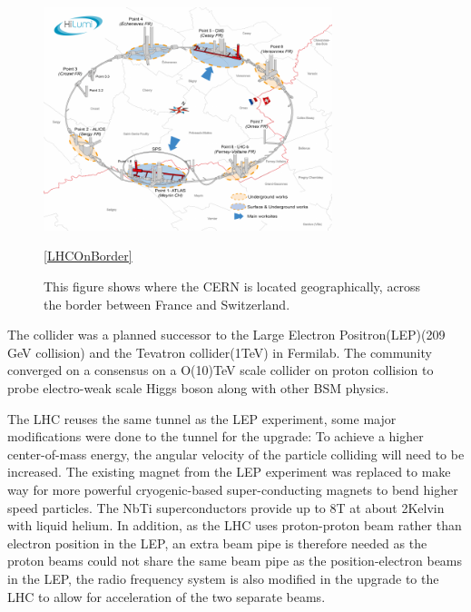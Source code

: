 \begin{figure}[!htb]
    \begin{center}
        \includegraphics[width=0.75\textwidth]{figures/chapter_ATLAS/LHCOnBorder}
        \caption{
			This figure shows where the CERN is located geographically, across the border between France and Switzerland. \cite{Brüning:782076} 
        }
        \label{fig:CERNAcceleratorComplex}
        \ref{LHCOnBorder}
    \end{center}
\end{figure}

The collider was a planned successor to the Large Electron Positron(LEP)(209 GeV collision) and the Tevatron collider(1TeV) in Fermilab. The community converged on a consensus on a O(10)TeV scale collider on proton collision to probe electro-weak scale Higgs boson along with other BSM physics.

The LHC reuses the same tunnel as the LEP experiment, some major modifications were done to the tunnel for the upgrade: To achieve a higher center-of-mass energy, the angular velocity of the particle colliding will need to be increased. The existing magnet from the LEP experiment was replaced to make way for more powerful cryogenic-based super-conducting magnets to bend higher speed particles. The NbTi superconductors provide up to 8T at about 2Kelvin with liquid helium. In addition, as the LHC uses proton-proton beam rather than electron position in the LEP, an extra beam pipe
is therefore needed as the proton beams could not share the same beam pipe as the position-electron beams in the LEP, the radio frequency system is also modified in the upgrade to the LHC to allow for acceleration of the two separate beams. 


